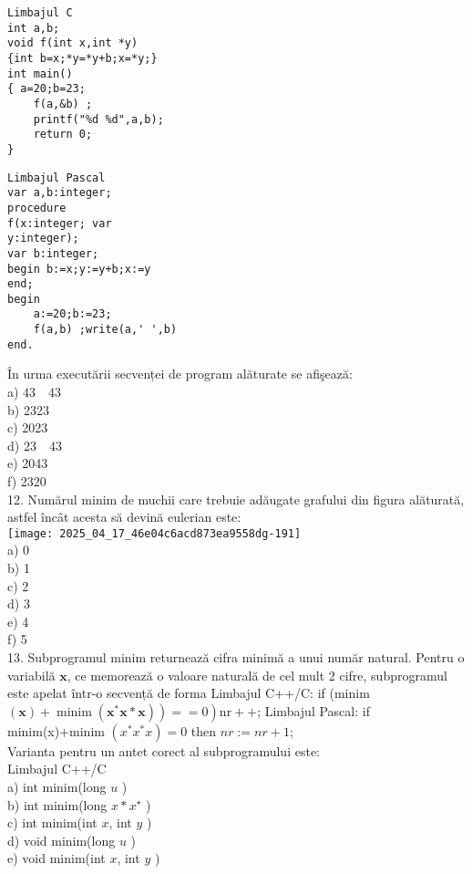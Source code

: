 \begin{verbatim}
Limbajul C
int a,b;
void f(int x,int *y)
{int b=x;*y=*y+b;x=*y;}
int main()
{ a=20;b=23;
    f(a,&b) ;
    printf("%d %d",a,b);
    return 0;
}
\end{verbatim}

\begin{verbatim}
Limbajul Pascal
var a,b:integer;
procedure
f(x:integer; var
y:integer);
var b:integer;
begin b:=x;y:=y+b;x:=y
end;
begin
    a:=20;b:=23;
    f(a,b) ;write(a,' ',b)
end.
\end{verbatim}

În urma executării secvenței de program alăturate se afişează:\\
a) $43 \quad 43$\\
b) 2323\\
c) 2023\\
d) $23 \quad 43$\\
e) 2043\\
f) 2320\\
12. Numărul minim de muchii care trebuie adăugate grafului din figura alăturată, astfel încât acesta să devină eulerian este:\\
\texttt{[image: 2025\_04\_17\_46e04c6acd873ea9558dg-191]}\\
a) 0\\
b) 1\\
c) 2\\
d) 3\\
e) 4\\
f) 5\\
13. Subprogramul minim returnează cifra minimă a unui număr natural. Pentru o variabilă $\mathbf{x}$, ce memorează o valoare naturală de cel mult 2 cifre, subprogramul este apelat într-o secvență de forma Limbajul C++/C: if (minim $\left.\left.(\mathbf{x})+\operatorname{minim}\left(\mathbf{x}^{*} \mathbf{x} * \mathbf{x}\right)\right)==0\right) \mathrm{nr}++$; Limbajul Pascal: if minim(x)+minim $\left(x^{*} x^{*} x\right)=0$ then $n r:=n r+1$;\\
Varianta pentru un antet corect al subprogramului este:\\
Limbajul C++/C\\
a) int minim(long $u$ )\\
b) int minim(long $x * x^{\star}$ )\\
c) int minim(int $x$, int $y$ )\\
d) void minim(long $u$ )\\
e) void minim(int $x$, int $y$ )\\
